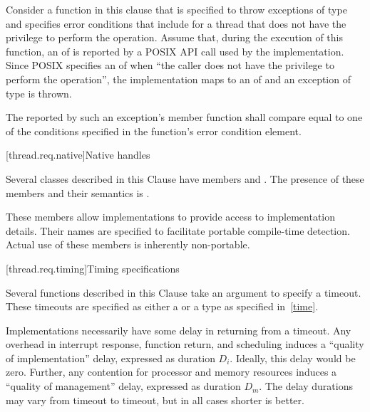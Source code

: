 \begin{example}
Consider a function in this clause that is specified to throw exceptions of type
 and specifies error conditions that include
 for a thread that does not have the privilege to
perform the operation. Assume that, during the execution of this function, an 
of  is reported by a POSIX API call used by the implementation. Since POSIX
specifies an  of  when ``the caller does not have the privilege
to perform the operation'', the implementation maps  to an
 of  and an exception
of type  is thrown.
\end{example}

\pnum
The  reported by such an exception's  member function
shall compare equal to one of the conditions specified in the function's error condition
element.

[thread.req.native]{Native handles}

\pnum
Several classes described in this Clause have members  and
. The presence of these members and their semantics is
.
\begin{note}
These members allow implementations to provide access
to implementation details. Their names are specified to facilitate portable compile-time
detection. Actual use of these members is inherently non-portable.
\end{note}

[thread.req.timing]{Timing specifications}

\pnum
Several functions described in this Clause take an argument to specify a timeout. These
timeouts are specified as either a  or a  type as
specified in~\ref{time}.

\pnum
Implementations necessarily have some delay in returning from a timeout. Any overhead in
interrupt response, function return, and scheduling induces a ``quality of implementation''
delay, expressed as duration $D_i$. Ideally, this delay would be zero. Further, any contention for
processor and memory resources induces a ``quality of management'' delay, expressed as duration
$D_m$. The delay durations may vary from timeout to timeout, but in all cases shorter is better.

